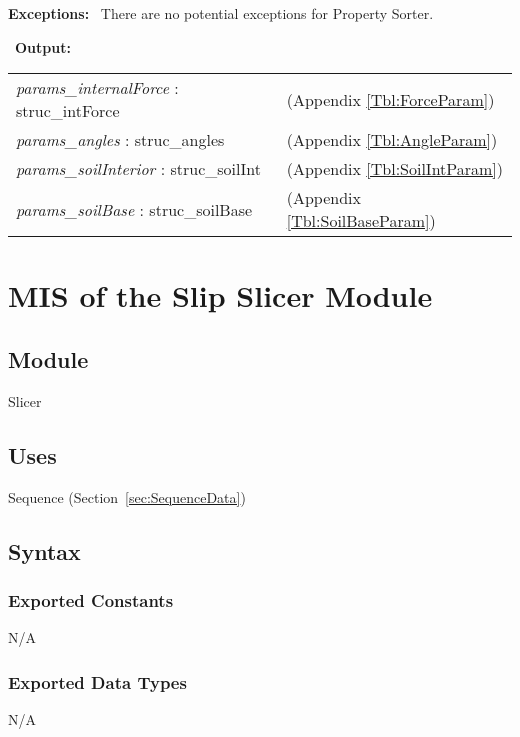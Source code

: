 \documentclass[12pt, titlepage]{article}
\begin{document}
\noindent \textbf{Exceptions:} ~\newline\noindent There are no
potential exceptions for Property Sorter.

~\newline\noindent \textbf{Output:}
\renewcommand*{\arraystretch}{1.5}
\begin{longtable}{p{} p{}}
  \textit{params\_internalForce} : struc\_intForce & (Appendix
  \ref{Tbl:ForceParam})\\
  
  \textit{params\_angles} : struc\_angles & (Appendix \ref{Tbl:AngleParam})\\

  \textit{params\_soilInterior} : struc\_soilInt & (Appendix
  \ref{Tbl:SoilIntParam})\\

  \textit{params\_soilBase} : struc\_soilBase & (Appendix
  \ref{Tbl:SoilBaseParam})\\
\end{longtable}


\section{MIS of the Slip Slicer Module} \label{sec:SlicerMod}

\subsection{Module}
Slicer

\subsection{Uses}
Sequence (Section~\ref{sec:SequenceData})

\subsection{Syntax}

\subsubsection{Exported Constants}
N/A

\subsubsection{Exported Data Types}
N/A
\end{document}
